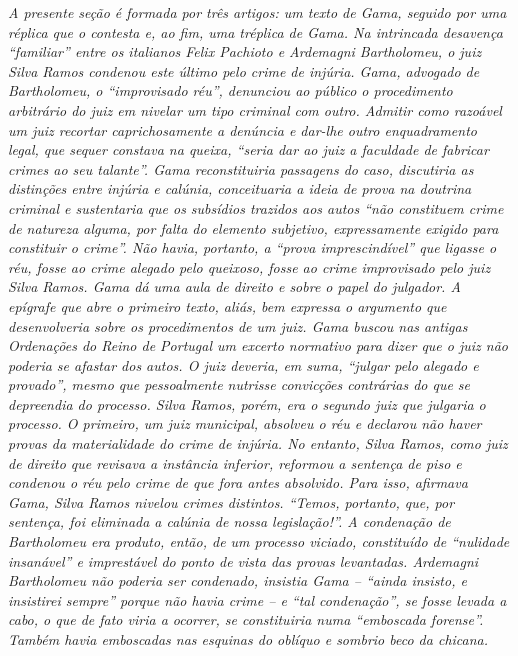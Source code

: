 \begin{argumento}
\emph{A presente seção é formada por três artigos: um texto de Gama,
seguido por uma réplica que o contesta e, ao fim, uma tréplica de Gama.
Na intrincada desavença ``familiar'' entre os italianos Felix Pachioto e
Ardemagni Bartholomeu, o juiz Silva Ramos condenou este último pelo
crime de injúria. Gama, advogado de Bartholomeu, o ``improvisado réu'',
denunciou ao público o procedimento arbitrário do juiz em nivelar um
tipo criminal com outro. Admitir como razoável um juiz recortar
caprichosamente a denúncia e dar-lhe outro enquadramento legal, que
sequer constava na queixa, ``seria dar ao juiz a faculdade de fabricar
crimes ao seu talante''. Gama reconstituiria passagens do caso,
discutiria as distinções entre injúria e calúnia, conceituaria a ideia
de prova na doutrina criminal e sustentaria que os subsídios trazidos
aos autos ``não constituem crime de natureza alguma, por falta do
elemento subjetivo, expressamente exigido para constituir o crime''. Não
havia, portanto, a ``prova imprescindível'' que ligasse o réu, fosse ao
crime alegado pelo queixoso, fosse ao crime improvisado pelo juiz Silva
Ramos. Gama dá uma aula de direito e sobre o papel do julgador. A
epígrafe que abre o primeiro texto, aliás, bem expressa o argumento que
desenvolveria sobre os procedimentos de um juiz. Gama buscou nas antigas
Ordenações do Reino de Portugal um excerto normativo para dizer que o
juiz não poderia se afastar dos autos. O juiz deveria, em suma, ``julgar
pelo alegado e provado'', mesmo que pessoalmente nutrisse convicções
contrárias do que se depreendia do processo. Silva Ramos, porém, era o
segundo juiz que julgaria o processo. O primeiro, um juiz municipal,
absolveu o réu e declarou não haver provas da materialidade do crime de
injúria. No entanto, Silva Ramos, como juiz de direito que revisava a
instância inferior, reformou a sentença de piso e condenou o réu pelo
crime de que fora antes absolvido. Para isso, afirmava Gama, Silva Ramos
nivelou crimes distintos. ``Temos, portanto, que, por sentença, foi
eliminada a calúnia de nossa legislação!''. A condenação de Bartholomeu
era produto, então, de um processo viciado, constituído de ``nulidade
insanável'' e imprestável do ponto de vista das provas levantadas.
Ardemagni Bartholomeu não poderia ser condenado, insistia Gama -- ``ainda
insisto, e insistirei sempre'' porque não havia crime -- e ``tal
condenação'', se fosse levada a cabo, o que de fato viria a ocorrer, se
constituiria numa ``emboscada forense''. Também havia emboscadas nas
esquinas do oblíquo e sombrio beco da chicana.}
\end{argumento}

